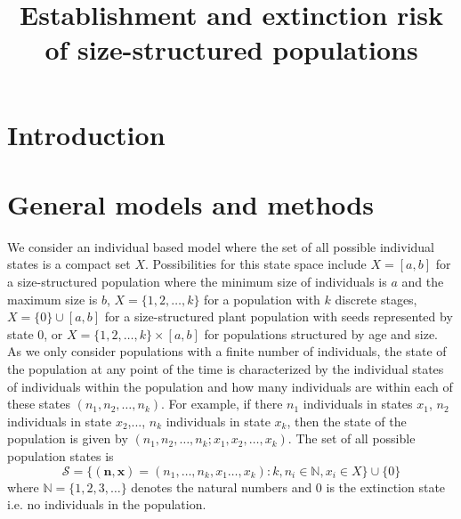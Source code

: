 \documentclass{amsart}
\def\N{\mathbb N}
\def\S{\mathcal S}
\def\n{\mathbf n}
\def\x{\mathbf x}
\begin{document}
\title[Establishment of size-structured populations]{Establishment and extinction risk of size-structured populations}
\maketitle

\section*{Introduction}


\section*{General models and methods}
We consider an individual based model where the set of all possible individual states is a compact set $X$. Possibilities for this state space include $X=[a,b]$ for a size-structured population where the minimum size of individuals is $a$ and the maximum size is $b$,  $X=\{1,2,\dots, k\}$ for a population with $k$ discrete stages, $X=\{0\}\cup [a,b]$ for a size-structured plant population with seeds represented by state $0$, or $X=\{1,2,\dots,k\} \times [a,b]$ for populations structured by age and size. As we only consider populations with a finite number of individuals, the state of the population at any point of the time is characterized by the individual states  of individuals within the population  and how many individuals are within each of these states $(n_1,n_2,\dots, n_k)$. For example, if there $n_1$ individuals in states $x_1$, $n_2$ individuals in state $x_2$,..., $n_k$ individuals in state $x_k$, then the state of the population is given by $(n_1,n_2,\dots, n_k; x_1,x_2,\dots, x_k)$. The set of all possible population states is 
\[
\S= \{(\n,\x)=(n_1,\dots, n_k, x_1\dots , x_k): k,n_i\in \N, x_i \in X\} \cup \{0\} 
\]
where $\N=\{1,2,3,\dots\}$ denotes the natural numbers and $0$ is the extinction state i.e. no individuals in the population. 
\end{document}
